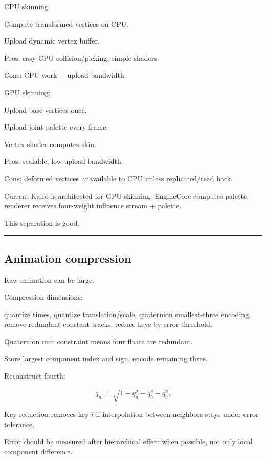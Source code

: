 \hypertarget{04-visual-computing-ii-ch041-cpu-vs-gpu-skinning}{}

CPU skinning:

Compute transformed vertices on CPU.

Upload dynamic vertex buffer.

Pros: easy CPU collision/picking, simple shaders.

Cons: CPU work + upload bandwidth.

GPU skinning:

Upload base vertices once.

Upload joint palette every frame.

Vertex shader computes skin.

Pros: scalable, low upload bandwidth.

Cons: deformed vertices unavailable to CPU unless replicated/read back.

Current Kairo is architected for GPU skinning: EngineCore computes palette, renderer receives four-weight influence stream + palette.

This separation is good.

\begin{center}\rule{0.5\linewidth}{0.5pt}\end{center}

\subsection{Animation compression}\label{04-visual-computing-ii-ch041-animation-compression}

\hypertarget{04-visual-computing-ii-ch041-animation-compression}{}

Raw animation can be large.

Compression dimensions:

quantize times, quantize translation/scale, quaternion smallest-three encoding, remove redundant constant tracks, reduce keys by error threshold.

Quaternion unit constraint means four floats are redundant.

Store largest component index and sign, encode remaining three.

Reconstruct fourth:

\[
q_m=
\sqrt{
1-
q_a^2-
q_b^2-
q_c^2
}.
\]

Key reduction removes key \(i\) if interpolation between neighbors stays under error tolerance.

Error should be measured after hierarchical effect when possible, not only local component difference.

